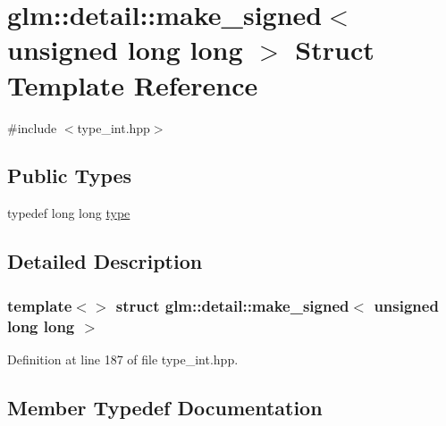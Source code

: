 \hypertarget{structglm_1_1detail_1_1make__signed_3_01unsigned_01long_01long_01_4}{}\section{glm\+::detail\+::make\+\_\+signed$<$ unsigned long long $>$ Struct Template Reference}
\label{structglm_1_1detail_1_1make__signed_3_01unsigned_01long_01long_01_4}


{\ttfamily \#include $<$type\+\_\+int.\+hpp$>$}

\subsection*{Public Types}
\begin{DoxyCompactItemize}
\item 
typedef long long \mbox{\hyperlink{structglm_1_1detail_1_1make__signed_3_01unsigned_01long_01long_01_4_a025f1f9880bc973147ffb0371771eb0b}{type}}
\end{DoxyCompactItemize}


\subsection{Detailed Description}
\subsubsection*{template$<$$>$\newline
struct glm\+::detail\+::make\+\_\+signed$<$ unsigned long long $>$}



Definition at line 187 of file type\+\_\+int.\+hpp.



\subsection{Member Typedef Documentation}
\mbox{\label{structglm_1_1detail_1_1make__signed_3_01unsigned_01long_01long_01_4_a025f1f9880bc973147ffb0371771eb0b}} 
